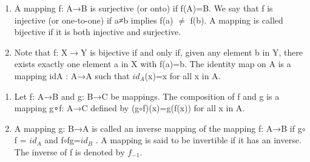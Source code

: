 \documentclass[cn,10pt,math=newtx,citestyle=gb7714-2015,bibstyle=gb7714-2015]{elegantbook}
\begin{document}
\begin{definition}
\begin{enumerate}
    \item A mapping f: A→B is surjective (or onto) if f(A)=B. 
We say that f is injective (or one-to-one) if a≠b
implies f(a) $\neq$ f(b). A mapping is called bijective if it 
is both injective and surjective.
    \item Note that f: X$\to$Y is bijective if and only if, given 
any element b in Y, there exists exactly one element 
a in X with f(a)=b. The identity map on A is a 
mapping idA
: A→A such that $id_A$(x)=x for all x in A.
\end{enumerate}
\end{definition}


\begin{definition}
\begin{enumerate}
    \item Let f: A→B and g: B→C be mappings. The 
composition of f and g is a mapping g∘f: A→C
defined by (g$\circ$f)(x)=g(f(x)) for all x in A.
    \item A mapping g: B→A is called an inverse mapping of 
the mapping f: A→B if g$\circ$f = $id_A$
and f$\circ$fg=$id_B$
. A 
mapping is said to be invertible if it has an inverse. 
The inverse of f is denoted by $f_{-1}$.
\end{enumerate}
\end{definition}
    
\end{document}

